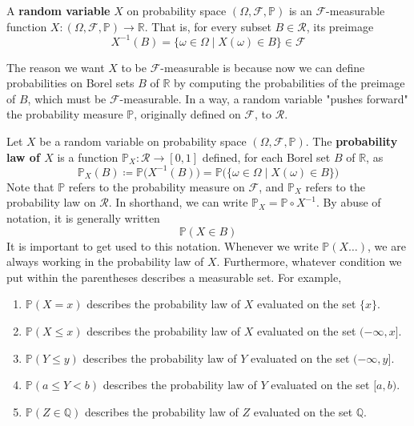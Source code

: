 \documentclass{article}
\begin{document}
    \begin{definition}
      A \textbf{random variable} $X$ on probability space $(\Omega, \mathcal{F}, \mathbb{P})$ is an $\mathcal{F}$-measurable function $X: (\Omega, \mathcal{F}, \mathbb{P}) \longrightarrow \mathbb{R}$. That is, for every subset $B \in \mathcal{R}$, its preimage 
      \begin{equation}
        X^{-1} (B) = \{\omega \in \Omega \mid X(\omega) \in B\} \in \mathcal{F}
      \end{equation}
    \end{definition}

    The reason we want $X$ to be $\mathcal{F}$-measurable is because now we can define probabilities on Borel sets $B$ of $\mathbb{R}$ by computing the probabilities of the preimage of $B$, which must be $\mathcal{F}$-measurable. In a way, a random variable "pushes forward" the probability measure $\mathbb{P}$, originally defined on $\mathcal{F}$, to $\mathcal{R}$.  

    \begin{definition}
      Let $X$ be a random variable on probability space $(\Omega, \mathcal{F}, \mathbb{P})$. The \textbf{probability law of $X$} is a function $\mathbb{P}_X : \mathcal{R} \longrightarrow [0, 1]$ defined, for each Borel set $B$ of $\mathbb{R}$, as 
      \begin{equation}
        \mathbb{P}_X (B) \coloneqq \mathbb{P} \big( X^{-1}(B) \big) = \mathbb{P} \big( \{\omega \in \Omega \mid X(\omega) \in B\} \big)
      \end{equation}
      Note that $\mathbb{P}$ refers to the probability measure on $\mathcal{F}$, and $\mathbb{P}_X$ refers to the probability law on $\mathcal{R}$. In shorthand, we can write $\mathbb{P}_X = \mathbb{P} \circ X^{-1}$. By abuse of notation, it is generally written
      \begin{equation}
        \mathbb{P}(X \in B)
      \end{equation}
      It is important to get used to this notation. Whenever we write $\mathbb{P}(X \ldots)$, we are always working in the probability law of $X$. Furthermore, whatever condition we put within the parentheses describes a measurable set. For example, 
      \begin{enumerate}
        \item $\mathbb{P}(X = x)$ describes the probability law of $X$ evaluated on the set $\{x\}$. 
        \item $\mathbb{P}(X \leq x)$ describes the probability law of $X$ evaluated on the set $(-\infty, x]$. 
        \item $\mathbb{P}(Y \leq y)$ describes the probability law of $Y$ evaluated on the set $(-\infty, y]$.
        \item $\mathbb{P}(a \leq Y < b)$ describes the probability law of $Y$ evaluated on the set $[a, b)$. 
        \item $\mathbb{P}(Z \in \mathbb{Q})$ describes the probability law of $Z$ evaluated on the set $\mathbb{Q}$. 
      \end{enumerate}
    \end{definition}
\end{document}
